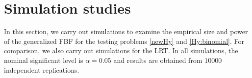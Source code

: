 \documentclass[11pt]{article}
\theoremstyle{plain}
\theoremstyle{definition}
\theoremstyle{remark}
\begin{document}









\section{Simulation studies} \label{sec:simu}
In this section, we carry out simulations to examine the empirical size and power of the generalized FBF for the testing problems \eqref{newHy} and \eqref{Hy:binomial}.
For comparison, we also carry out simulations for the LRT.
In all simulations, the nominal significant level is $\alpha = 0.05$ and results are obtained from $10000$ independent replications.
\end{document}
